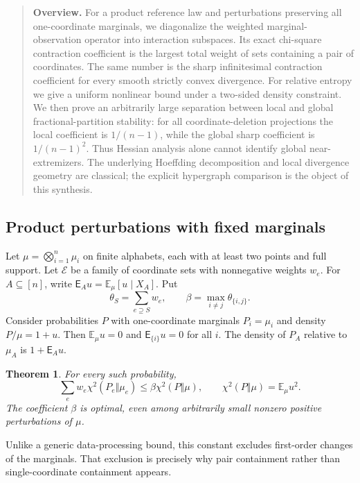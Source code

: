 \documentclass[11pt,a4paper]{article}
\newtheorem{theorem}{Theorem}[section]
\theoremstyle{definition}\newtheorem{definition}[theorem]{Definition}
\theoremstyle{remark}\newtheorem{remark}[theorem]{Remark}
\newcommand{\E}{\mathbb E}\newcommand{\one}{\mathbf 1}\newcommand{\1}{\mathbf 1}
\numberwithin{equation}{section}
\begin{document}
\begin{quote}\small\textbf{Overview.} For a product reference law and perturbations preserving all one-coordinate marginals, we diagonalize the weighted marginal-observation operator into interaction subspaces. Its exact chi-square contraction coefficient is the largest total weight of sets containing a pair of coordinates. The same number is the sharp infinitesimal contraction coefficient for every smooth strictly convex divergence. For relative entropy we give a uniform nonlinear bound under a two-sided density constraint. We then prove an arbitrarily large separation between local and global fractional-partition stability: for all coordinate-deletion projections the local coefficient is $1/(n-1)$, while the global sharp coefficient is $1/(n-1)^2$. Thus Hessian analysis alone cannot identify global near-extremizers. The underlying Hoeffding decomposition and local divergence geometry are classical; the explicit hypergraph comparison is the object of this synthesis.\end{quote}

\subsection{Product perturbations with fixed marginals}\label{R06-sec-1}
Let $\mu=\bigotimes_{i=1}^n\mu_i$ on finite alphabets, each with at least two points and full support. Let $\mathcal E$ be a family of coordinate sets with nonnegative weights $w_e$. For $A\subseteq[n]$, write $\mathsf E_Au=\E_\mu[u\mid X_A]$. Put
\[
\theta_S=\sum_{e\supseteq S}w_e,\qquad
\beta=\max_{i\ne j}\theta_{\{i,j\}}.
\]
Consider probabilities $P$ with one-coordinate marginals $P_i=\mu_i$ and density
$P/\mu=1+u$. Then $\E_\mu u=0$ and $\mathsf E_{\{i\}}u=0$ for all $i$. The density of $P_A$ relative to $\mu_A$ is $1+\mathsf E_Au$.

\begin{theorem}\label{R06-chi}
For every such probability,
\[
\sum_e w_e\chi^2(P_e\Vert\mu_e)\leq\beta\chi^2(P\Vert\mu),
\qquad
\chi^2(P\Vert\mu)=\E_\mu u^2.
\]
The coefficient $\beta$ is optimal, even among arbitrarily small nonzero positive perturbations of $\mu$.
\end{theorem}
Unlike a generic data-processing bound, this constant excludes first-order changes of the marginals. That exclusion is precisely why pair containment rather than single-coordinate containment appears.
\end{document}

